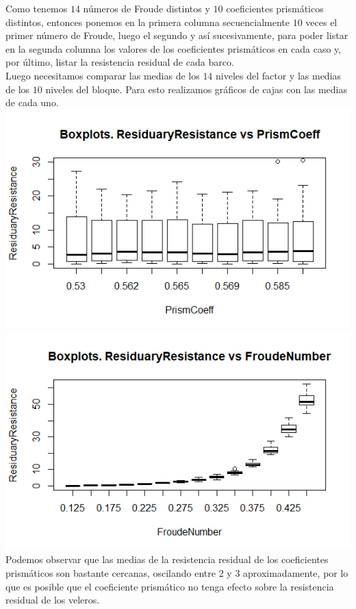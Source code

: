 \documentclass[twoside]{article}
\begin{document}
\begin{multicols}{2}
Como tenemos $14$ n\'umeros de Froude distintos y $10$ coeficientes prism\'aticos distintos, entonces ponemos en la primera columna secuencialmente $10$ veces el primer n\'umero de Froude, luego el segundo y as\'i sucesivamente, para poder listar en la segunda columna los valores de los coeficientes prism\'aticos en cada caso y, por \'ultimo, listar la resistencia residual de cada barco.\\

Luego necesitamos comparar las medias de los $14$ niveles del factor y las medias de los $10$ niveles del bloque. Para esto realizamos gr\'aficos de cajas con las medias de cada uno.\\

\includegraphics[scale = 0.4]{images/pic_12.png} \\
\includegraphics[scale=0.4]{images/pic_13.png} \\

Podemos observar que las medias de la resistencia residual de los coeficientes prism\'aticos son bastante cercanas, oscilando entre $2$ y $3$ aproximadamente, por lo que es posible que el coeficiente prism\'atico no tenga efecto sobre la resistencia residual de los veleros. 


\end{multicols}
\end{document}
